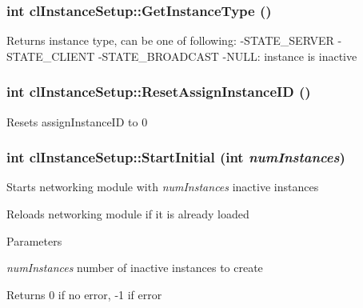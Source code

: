 \hypertarget{classcl_instance_setup_af456c8408da960ec6ae3cec57da1f17b}{
\subsubsection[{GetInstanceType}]{\setlength{\rightskip}{0pt plus 5cm}int clInstanceSetup::GetInstanceType ()}}
\label{classcl_instance_setup_af456c8408da960ec6ae3cec57da1f17b}
\begin{DoxyReturn}{Returns}
instance type, can be one of following: -\/STATE\_\-SERVER -\/STATE\_\-CLIENT -\/STATE\_\-BROADCAST -\/NULL: instance is inactive 
\end{DoxyReturn}
\hypertarget{classcl_instance_setup_ae5afd30ceb932796fd244c1aaf139433}{
\subsubsection[{ResetAssignInstanceID}]{\setlength{\rightskip}{0pt plus 5cm}int clInstanceSetup::ResetAssignInstanceID ()}}
\label{classcl_instance_setup_ae5afd30ceb932796fd244c1aaf139433}
Resets {\ttfamily assignInstanceID} to 0 \hypertarget{classcl_instance_setup_af5cb540183530a759bc262debfca9e34}{
\subsubsection[{StartInitial}]{\setlength{\rightskip}{0pt plus 5cm}int clInstanceSetup::StartInitial (int {\em numInstances})}}
\label{classcl_instance_setup_af5cb540183530a759bc262debfca9e34}
Starts networking module with {\itshape numInstances\/} inactive instances \par
 Reloads networking module if it is already loaded 
\begin{DoxyParams}{Parameters}
\item[{\em numInstances}]number of inactive instances to create \end{DoxyParams}
\begin{DoxyReturn}{Returns}
0 if no error, -\/1 if error 
\end{DoxyReturn}


